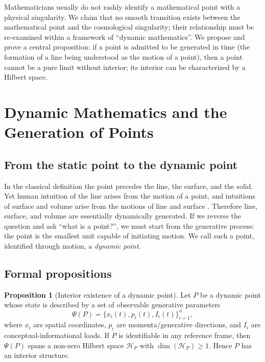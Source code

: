 \documentclass[11pt,a4paper]{article}
\theoremstyle{definition}
\newtheorem{proposition}{Proposition}
\begin{document}
Mathematicians usually do not rashly identify a mathematical point with a physical singularity. We claim that no smooth transition exists between the mathematical point and the cosmological singularity; their relationship must be re-examined within a framework of ``dynamic mathematics''. We propose and prove a central proposition: if a point is admitted to be generated in time (the formation of a line being understood as the motion of a point), then a point cannot be a pure limit without interior; its interior can be characterized by a Hilbert space.

\section{Dynamic Mathematics and the Generation of Points}

\subsection{From the static point to the dynamic point}

In the classical definition the point precedes the line, the surface, and the solid. Yet human intuition of the line arises from the motion of a point, and intuitions of surface and volume arise from the motions of line and surface \cite{klein1939}. Therefore line, surface, and volume are essentially dynamically generated. If we reverse the question and ask ``what is a point?'', we must start from the generative process: the point is the smallest unit capable of initiating motion. We call such a point, identified through motion, a \textit{dynamic point}.

\subsection{Formal propositions}

\begin{proposition}[Interior existence of a dynamic point]
Let $P$ be a dynamic point whose state is described by a set of observable generative parameters
\begin{equation}
\Psi(P) = \{x_i(t), p_i(t), I_i(t)\}_{i=1}^{n},
\end{equation}
where $x_i$ are spatial coordinates, $p_i$ are momenta/generative directions, and $I_i$ are conceptual-informational loads. If $P$ is identifiable in any reference frame, then $\Psi(P)$ spans a non-zero Hilbert space $\mathcal{H}_P$ with $\dim(\mathcal{H}_P) \ge 1$. Hence $P$ has an interior structure.
\end{proposition}
\end{document}
